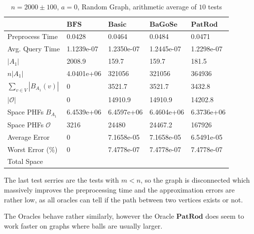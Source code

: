 \documentclass[shortabstract, lic, english]{iithesis}
\theoremstyle{definition} \newtheorem{definition}{Definition}[chapter]
\theoremstyle{plain} \newtheorem{remark}[definition]{Observation}
\theoremstyle{plain} \newtheorem{theorem}[definition]{Theorem}
\theoremstyle{plain} \newtheorem{lemma}[definition]{Lemma}
\theoremstyle{plain} \newtheorem{conjecture}[definition]{Conjecture}
\begin{document}
\begin{table}[H] \label{test:random.a0}
    \centering
    \begin{tabular}{ |p{3cm}||p{2cm}|p{2cm}|p{2cm}|p{2cm}|  } 
        \hline
        & $\mathbf{BFS}$ & $\mathbf{Basic}$ & $\mathbf{BaGoSe}$ & $\mathbf{PatRod}$ \\
        \hline
        \hline
        Preprocess Time                 & 0.0428     & 0.0464     & 0.0484      & 0.0471     \\
        \hline
        Avg. Query Time                 & 1.1239e-07 & 1.2350e-07 & 1.2445e-07  & 1.2298e-07 \\
        \hline
        $|A_1|$                         & 2008.9     & 159.7      & 159.7       & 181.5      \\
        \hline
        $n |A_1|$                       & 4.0401e+06 & 321056     & 321056      & 364936     \\
        \hline
        $\sum_{v \in V} |B_{A_1}(v)| $  & 0          & 3521.7     & 3521.7      & 3432.8     \\
        \hline
        $|\mathcal{O}|$                 & 0          & 14910.9    & 14910.9     & 14202.8    \\
        \hline
        Space PHFs $B_{A_1}$            & 6.4539e+06 & 6.4597e+06 & 6.4604e+06  & 6.3736e+06 \\
        \hline
        Space PHFs $\mathcal{O}$        & 3216       & 24480      & 24467.2     & 167926     \\
        \hline
        Average Error                   & 0          & 7.1658e-05 & 7.1658e-05  & 6.5491e-05 \\
        \hline
        Worst Error (\%)                & 0          & 7.4778e-07 & 7.4778e-07  & 7.4778e-07 \\
        \hline
        Total Space                     &            &            &             &            \\
        \hline

    \end{tabular}
    \caption{$n = 2000 \pm 100$, $a = 0$, Random Graph, arithmetic average of $10$ tests}
\end{table}

The last test serries are the tests with $m < n$, so the graph is disconnected which massively improves the preprocessing time and the approximation errors are rather low,
as all oracles can tell if the path between two vertices exists or not.


The Oracles behave rather similarly, however the Oracle $\mathbf{PatRod}$ does seem to work faster on graphs where balls are usually larger.
\end{document}
